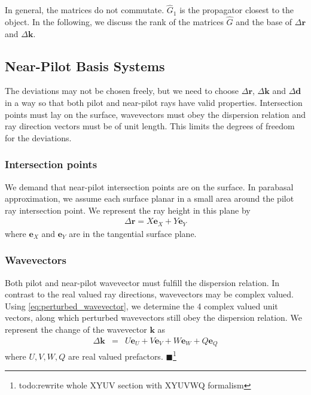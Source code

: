 \documentclass[12pt,a4paper,twoside,openright,BCOR10mm,headsepline,titlepage,abstracton,chapterprefix,final]{scrreprt}
\newcommand\Vector[1]{{\mathbf{#1}}}
\newcommand\wavenumber{k}
\newcommand\Wavevector{\Vector{\wavenumber}}
\newcommand{\remark}[1]{{\color{red}$\blacksquare$}\footnote{{\color{red}#1}}}
\begin{document}
In general, the matrices do not commutate. $\hat{G}_1$ is the propagator closest to the object.
In the following, we discuss the rank of the matrices $\hat{G}$ and the base of $\Delta \Vector{r}$ and $\Delta \Wavevector$.


\subsection{Near-Pilot Basis Systems}

The deviations may not be chosen freely, but we need to choose
$\Delta\Vector{r}$, $\Delta\Wavevector$ and $\Delta\Vector{d}$ 
in a way so that both pilot and near-pilot rays
have valid properties.
Intersection points must lay on the surface,
wavevectors must obey the dispersion relation 
and ray direction vectors must be of unit length.
This limits the degrees of freedom for the deviations.

\subsubsection{Intersection points}

We demand that near-pilot intersection points are on the surface.
In parabasal approximation, we assume each surface planar in a small area around the pilot ray intersection point. 
We represent the ray height in this plane by
\begin{eqnarray}
 \Delta\Vector{r} = X \Vector{e}_{X} + Y \Vector{e}_{Y}
 \label{eq:deltaR_equals_XY}
\end{eqnarray}
where $\Vector{e}_{X}$ and $\Vector{e}_{Y}$ are in the tangential surface plane.

\subsubsection{Wavevectors}
Both pilot and near-pilot wavevector must fulfill the dispersion relation. 
In contrast to the real valued ray directions, wavevectors may be complex valued.
Using \eqref{eq:perturbed_wavevector}, we determine the 4 complex valued unit vectors,
along which perturbed wavevectors still obey the dispersion relation.
We represent the change of the wavevector $\Wavevector$ as
\begin{eqnarray}
 \Delta \Wavevector &=& U \Vector{e}_U + V \Vector{e}_V + W \Vector{e}_W + Q \Vector{e}_Q
\end{eqnarray}
where $U,V,W,Q$ are real valued prefactors.
\remark{todo:rewrite whole XYUV section with XYUVWQ formalism}
\end{document}
